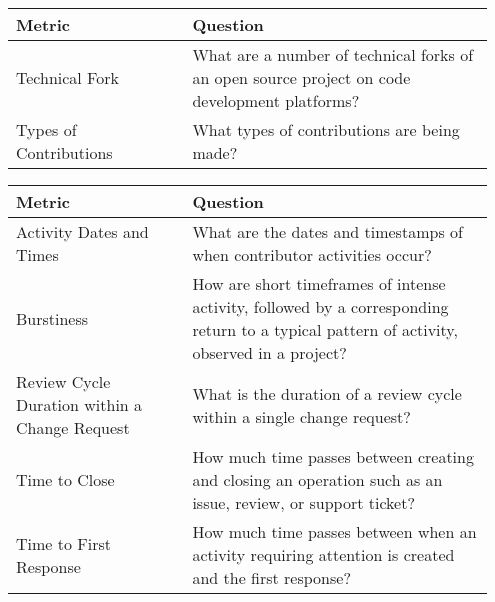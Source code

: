 \begin{table}[ht!]
	\centering
	\begin{tabular}{|p{0.35\linewidth} | p{0.6\linewidth}|}
			\hline
			\hfil \textbf{Metric}  & \hfil \textbf{Question} \\ 
			\hline		
			Technical Fork & What are a number of technical forks of an open 
			source project on code development platforms? \\ %
			\hline
			Types of Contributions & What types of contributions are being 
			made? \\ %
			\hline			
	\end{tabular}
\end{table}

\begin{table}[ht]
	\centering
	\begin{tabular}{|p{0.35\linewidth} | p{0.6\linewidth}|}
		\hline
		\hfil \textbf{Metric} & \hfil \textbf{Question} \\ 
		\hline	
		Activity Dates and Times & What are the dates and timestamps of when 
		contributor activities occur? \\
		\hline
		Burstiness & How are short timeframes of intense activity, followed by 
		a corresponding return to a typical pattern of activity, observed in a 
		project? \\ 
		\hline		
		Review Cycle Duration within a Change Request & What is the duration of 
		a review cycle within a single change request? \\ 
		\hline 
		Time to Close & How much time passes between creating and closing an 
		operation such as an issue, review, or support ticket? \\
		\hline
		Time to First Response & How much time passes between when an activity 
		requiring attention is created and the first response? \\
		\hline
	\end{tabular}
\end{table}

